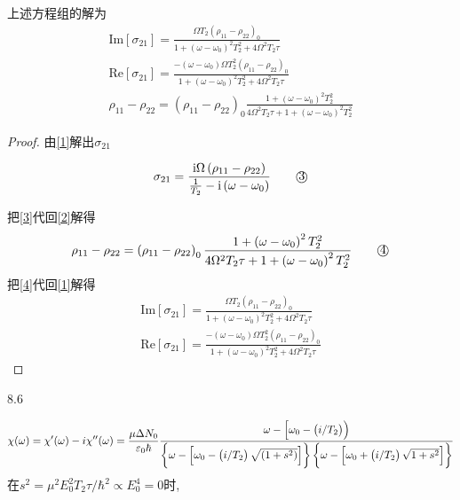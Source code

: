 \begin{theorem}
上述方程组的解为
\begin{gather*}
\text{Im}\left[\sigma_{21}\right]=\frac{\Omega T_{2}\left(\rho_{11}-\rho_{22}\right)_0}{1+\left(\omega-\omega_{0}\right)^{2} T_{2}^{2}+4 \Omega^{2} T_{2} \tau}\\ 
\text{Re}\left[\sigma_{21}\right]=\frac{-\left(\omega-\omega_{0}\right) \Omega T_{2}^{2}\left(\rho_{11}-\rho_{22}\right)_{0}}{1+\left(\omega-\omega_{0}\right)^{2} T_{2}^{2}+4 \Omega^{2} T_{2} \tau}\\
\rho_{11}-\rho_{22}=\left(\rho_{11}-\rho_{22}\right)_0 \frac{1+\left(\omega-\omega_{0}\right)^{2} T_{2}^2}{4 \Omega^{2} T_{2} \tau+1+\left(\omega-\omega_{0}\right)^{2} T_{2}^{2}}
\end{gather*}    
\end{theorem}
\begin{proof}

由\ref{1}解出$\sigma_{21}$

\begin{equation}
\sigma_{21}=\frac{\mathrm{i} \Omega\left(\rho_{11}-\rho_{22}\right)}{\frac{1}{T_{2}}-\mathrm{i}\left(\omega-\omega_{0}\right)}
\tag*{\textcircled{3}}\label{3} 
\end{equation}

把\ref{3}代回\ref{2}解得
\begin{equation}
\rho_{11}-\rho_{22}=\left(\rho_{11}-\rho_{22}\right)_0 \frac{1+\left(\omega-\omega_{0}\right)^{2} T_{2}^2}{4 \Omega^{2} T_{2} \tau+1+\left(\omega-\omega_{0}\right)^{2} T_{2}^{2}} 
\tag*{\textcircled{4}}\label{4}    
\end{equation}
把\ref{4}代回\ref{1}解得
\begin{gather*}
\text{Im}\left[\sigma_{21}\right]=\frac{\Omega T_{2}\left(\rho_{11}-\rho_{22}\right)_0}{1+\left(\omega-\omega_{0}\right)^{2} T_{2}^{2}+4 \Omega^{2} T_{2} \tau}\\ 
\text{Re}\left[\sigma_{21}\right]=\frac{-\left(\omega-\omega_{0}\right) \Omega T_{2}^{2}\left(\rho_{11}-\rho_{22}\right)_{0}}{1+\left(\omega-\omega_{0}\right)^{2} T_{2}^{2}+4 \Omega^{2} T_{2} \tau}
\end{gather*}
\end{proof}



8.6

\[\chi(\omega)=\chi^{\prime}(\omega)-i \chi^{\prime \prime}(\omega)\\=\frac{\mu \Delta N_{0}}{\varepsilon_{0} \hbar}\frac{\omega-\left[\omega_{0}-\left(i / T_{2}\right)\right)}{\left\{\omega-\left[\omega_{0}-\left(i / T_{2}\right) \sqrt{\left(1+s^{2}\right)}\right]\right\}\left\{\omega-\left[\omega_{0}+\left(i / T_{2}\right) \sqrt{1+s^{2}}\right]\right\}} \]
在\(s^{2}=\mu^{2} E_0^{2} T_{2} \tau / \hbar^{2} \propto E_{0}^{4}=0\)时,

